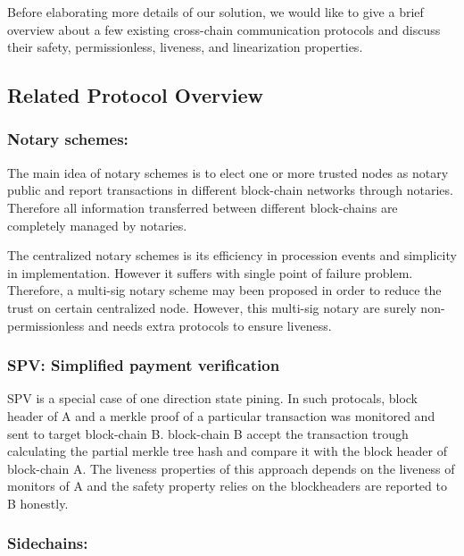\documentclass[acmtog, natbib=false]{acmart}
\begin{document}
Before elaborating more details of our solution, we would like to give a brief overview about a few existing cross-chain communication protocols and discuss their safety, permissionless, liveness, and linearization properties.


\subsection{Related Protocol Overview}
\subsubsection{Notary schemes:}

The main idea of notary schemes is to elect one or more trusted nodes as notary public and report transactions in different block-chain networks through notaries\cite{qin2018overview}. Therefore all information transferred between different block-chains are completely managed by notaries.

The centralized notary schemes is its efficiency in procession events and simplicity in implementation. However it suffers with single point of failure problem. Therefore, a multi-sig notary scheme may been proposed in order to reduce the trust on certain centralized node. However, this multi-sig notary are surely non-permissionless and needs extra protocols to ensure liveness.
    
\subsubsection{SPV: Simplified payment verification}

    SPV is a special case of one direction state pining. In such protocals, block header of A and a merkle proof of a particular transaction was monitored and sent to target block-chain B. block-chain B accept the transaction trough calculating the partial merkle tree hash and compare it with the block header of block-chain A. The liveness properties of this approach depends on the liveness of monitors of A and the safety property relies on the blockheaders are reported to B honestly. 


\subsubsection{Sidechains:}
\end{document}
